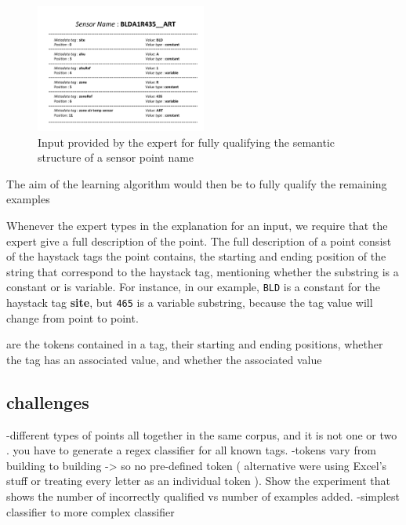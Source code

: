 \begin{figure}[h!]
  
  \centering
    \includegraphics[width=0.5\textwidth]{figs/inputExample.pdf}
\caption{Input provided by the expert for fully qualifying the semantic structure of a sensor point name}
\label{fig:exampleInput}
\end{figure}

The aim of the learning algorithm would then be to fully qualify the remaining examples



Whenever the expert types in the explanation for an input, we require that the expert give a full description of the point. The full description of a point consist of the haystack tags the point contains, the starting and ending position of the string that correspond to the haystack tag, mentioning whether the substring is a constant or is variable. For instance, in our example, {\tt BLD} is a constant for the haystack tag {\bf site}, but {\tt 465} is a variable substring, because the tag value will change from point to point. 


are the tokens contained in a tag, their starting and ending positions, whether the tag has an associated value, and whether the associated value 

\subsection{challenges}


-different types of points all together in the same corpus, and it is not one or two . you have to generate a regex classifier for all known tags. 
-tokens vary from building to building -> so no pre-defined token ( alternative were using Excel's stuff or treating every letter as an individual token ). Show the experiment that shows the number of incorrectly qualified vs number of examples added.
-simplest classifier to more complex classifier



